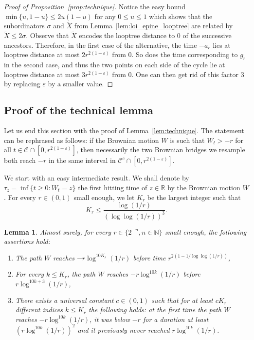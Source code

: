 \documentclass[british, a4paper,11pt]{article}
\numberwithin{equation}{section}
\newtheorem{lem}[thm]{Lemma}
\theoremstyle{definition}
\newcommand{\R}{\mathbb{R}}
\newcommand{\N}{\mathbb{N}}
\begin{document}
\begin{proof}[Proof of Proposition~\ref{prop:technique}]
Notice the easy bound $\min\{u, 1-u\} \leq 2 u(1-u)$ for any $0 \leq u \leq 1$ which shows that the subordinators $\sigma$ and $\widetilde{X}$ from Lemma~\ref{lem:loi_epine_looptree} are related by
$\widetilde{X} \leq 2 \sigma$.
Observe that $\widetilde{X}$ encodes the looptree distance to $0$ of the successive ancestors.
Therefore, in the first case of the alternative, the time $-a_r$ lies at looptree distance at most $2r^{2(1-\varepsilon)}$ from $0$. So does the time corresponding to $g_r$ in the second case, and thus the two points on each side of the cycle lie at looptree distance at most $3 r^{2(1-\varepsilon)}$ from $0$. One can then get rid of this factor $3$ by replacing $\varepsilon$ by a smaller value.
\end{proof}


\subsection{Proof of the technical lemma}
\label{sec:appendice_volume}




Let us end this section with the proof of Lemma~\ref{lem:technique}. 
The statement can be rephrased as follows: if the Brownian motion $W$ is such that $W_t > -r$ for all $t \in \mathcal{C} \cap [0, r^{2(1-\varepsilon)}]$, then necessarily the two Brownian bridges we resample both reach $-r$ in the same interval in $\mathcal{C}^c \cap [0, r^{2(1-\varepsilon)}]$.


We start with an easy intermediate result. We shall denote by $\tau_z = \inf\{t \geq 0 \colon W_t = z\}$ the first hitting time of $z \in \R$ by the Brownian motion $W$.
For every $r \in (0,1)$ small enough, we let 
$K_r$ be the largest integer such that
\begin{equation}\label{eq:K_r_lemme_technique}
K_r \leq \frac{\log(1/r)}{(\log\log(1/r))^3}
.\end{equation}


\begin{lem}\label{lem:ruine}
Almost surely, for every $r \in \{2^{-n}, n \in \N\}$ small enough, the following assertions hold:
\begin{enumerate}
\item The path $W$ reaches $-r \log^{10 K_{r}}(1/r)$ before time $r^{2(1-1/\log\log(1/r))}$, 
\item For every $k \leq K_r$, the path $W$ reaches $-r \log^{10 k}(1/r)$ before $r \log^{10 k + 3}(1/r)$,
\item 
There exists a universal constant $c \in (0,1)$ such that for at least $c K_r$ different indices $k \leq K_r$ the following holds: 
at the first time the path $W$ reaches $-r \log^{10 k}(1/r)$, it was below $-r$ for a duration at least $(r \log^{10 k}(1/r))^2$ and it previously never reached $r \log^{10 k}(1/r)$.
\end{enumerate}
\end{lem}
\end{document}
